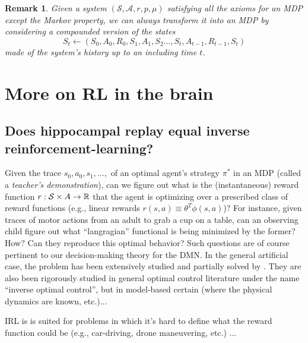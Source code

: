 \documentclass[10pt,letterpaper]{article}
\newtheorem{remark}{Remark}
\begin{document}
\small
% 
% 



\appendix

\begin{remark}
  Given a system $(\mathcal S, \mathcal A, r, p, \mu)$ satisfying all the axioms for an MDP
  except the Markov property, we can always transform it into an MDP by considering a compounded
  version of the states
  $$S_t \leftarrow (S_0,A_0,R_0,S_1,A_1,S_2\ldots,S_t,A_{t-1},R_{t-1},S_{t})$$ made of the system's
  history up to an including time $t$.
\end{remark}

\section{More on RL in the brain}
\subsection{Does hippocampal replay equal inverse reinforcement-learning?}
  Given the trace $s_0,a_0,s_1,\ldots,$ of an optimal agent's strategy $\pi^*$ in
  an MDP (called a \textit{teacher's demonstration}), can we figure out what is the
  (instantaneous) reward function $r: \mathcal S \times \mathcal \mathcal A
  \rightarrow \mathbb R$ that the agent is optimizing over a prescribed class of reward functions
  (e.g., linear rewards $r(s,a) \equiv \theta^T\phi(s,a)$)?
  For instance, given traces of motor actions from an adult to grab a cup on a table,
  can an observing child figure out what ``langragian'' functional is being minimized by the former?
  How? Can they reproduce this optimal behavior?
Such questions are of course pertinent to our decision-making theory for the DMN.
In the general artificial case, the problem has been extensively studied and partially solved by
\citep{abbeel2004}. They are also been rigorously studied in general optimal control literature under the name
``inverse optimal control'', but in model-based certain (where the physical dynamics are known, etc.)...

IRL is is suited for problems in which it's hard to define what the reward function could be
(e.g.,  car-driving, drone maneuvering, etc.) ...
\end{document}
